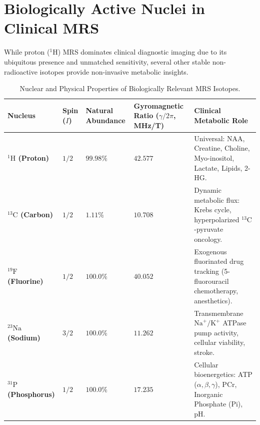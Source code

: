 \documentclass[11pt,a4paper]{article}
\begin{document}
\section{Biologically Active Nuclei in Clinical MRS}
While proton ($^1\text{H}$) MRS dominates clinical diagnostic imaging due to its ubiquitous presence and unmatched sensitivity, several other stable non-radioactive isotopes provide non-invasive metabolic insights.

\begin{table}[htbp]
\centering
\small
\setlength{\tabcolsep}{3pt}
\caption{Nuclear and Physical Properties of Biologically Relevant MRS Isotopes.}
\label{tab:mrs_nuclei}
\begin{tabular}{p{2.6cm} p{1.8cm} p{2.2cm} p{2.8cm} p{4.6cm}}
\toprule
\textbf{Nucleus} & \textbf{Spin ($I$)} & \textbf{Natural Abundance} & \textbf{Gyromagnetic Ratio ($\gamma/2\pi$, MHz/T)} & \textbf{Clinical Metabolic Role} \\
\midrule
\textbf{$^1\text{H}$ (Proton)} & $1/2$ & $99.98\%$ & $42.577$ & Universal: NAA, Creatine, Choline, Myo-inositol, Lactate, Lipids, 2-HG. \\
\addlinespace
\textbf{$^{13}\text{C}$ (Carbon)} & $1/2$ & $1.11\%$ & $10.708$ & Dynamic metabolic flux: Krebs cycle, hyperpolarized $^{13}\text{C}$-pyruvate oncology. \\
\addlinespace
\textbf{$^{19}\text{F}$ (Fluorine)} & $1/2$ & $100.0\%$ & $40.052$ & Exogenous fluorinated drug tracking (5-fluorouracil chemotherapy, anesthetics). \\
\addlinespace
\textbf{$^{23}\text{Na}$ (Sodium)} & $3/2$ & $100.0\%$ & $11.262$ & Transmembrane $\text{Na}^+/\text{K}^+$ ATPase pump activity, cellular viability, stroke. \\
\addlinespace
\textbf{$^{31}\text{P}$ (Phosphorus)} & $1/2$ & $100.0\%$ & $17.235$ & Cellular bioenergetics: ATP ($\alpha,\beta,\gamma$), PCr, Inorganic Phosphate (Pi), pH. \\
\bottomrule
\end{tabular}
\end{table}
\end{document}
